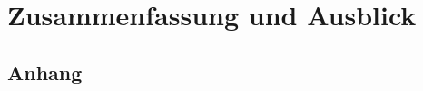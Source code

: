 \documentclass[
    11pt, %
    DIV=11,
    ngerman, %
    a4paper, %
    oneside, %
    titlepage, %
    parskip=half, %
    headings=normal, %
    listof=totoc, %
    bibliography=totoc, %
    bibliographyWebverzeichnis=totoc,
    index=totoc, %
    captions=tableheading, %
    final %
]{scrreprt}
\begin{document}
\chapter{Zusammenfassung und Ausblick}
	
	
	




\renewcommand{\refname}{Literatur- und Webverzeichnis} %



	
	



	


\begin{appendix}
    \clearpage
    \chapter{Anhang}
    \label{sec:Anhang}
    \setdefaultleftmargin{1em}{}{}{}{}{}
    
\end{appendix}

\end{document}
